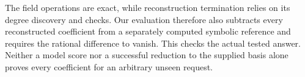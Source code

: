 The field operations are exact, while reconstruction termination relies on its degree discovery and checks. Our evaluation therefore also subtracts every reconstructed coefficient from a separately computed symbolic reference and requires the rational difference to vanish. This checks the actual tested answer. Neither a model score nor a successful reduction to the supplied basis alone proves every coefficient for an arbitrary unseen request.
